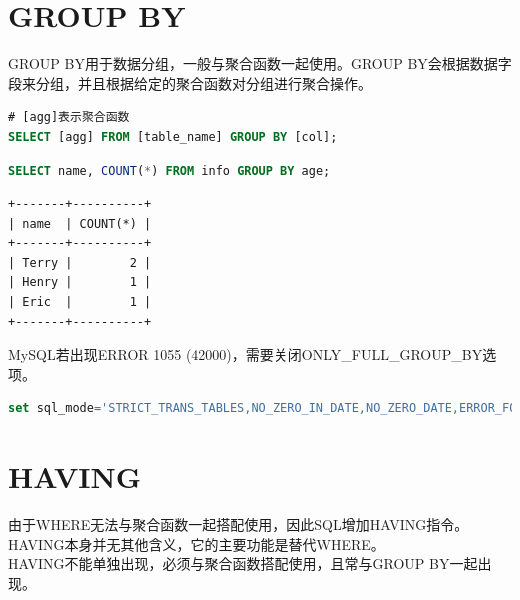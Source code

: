 \documentclass[12pt, openany, oneside]{book}
\begin{document}
\section{GROUP BY}

GROUP BY用于数据分组，一般与聚合函数一起使用。GROUP BY会根据数据字段来分组，并且根据给定的聚合函数对分组进行聚合操作。

\vspace{-0.5cm}

\begin{lstlisting}[language=SQL]
# [agg]表示聚合函数
SELECT [agg] FROM [table_name] GROUP BY [col];
\end{lstlisting}

\vspace{0.5cm}


\begin{lstlisting}[language=SQL]
SELECT name, COUNT(*) FROM info GROUP BY age;
\end{lstlisting}

\begin{tcolorbox}
    \begin{verbatim}
+-------+----------+
| name  | COUNT(*) |
+-------+----------+
| Terry |        2 |
| Henry |        1 |
| Eric  |        1 |
+-------+----------+
	\end{verbatim}
\end{tcolorbox}

MySQL若出现ERROR 1055 (42000)，需要关闭ONLY\_FULL\_GROUP\_BY选项。

\vspace{-0.5cm}

\begin{lstlisting}[language=SQL, breaklines=true, breakatwhitespace=false]
set sql_mode='STRICT_TRANS_TABLES,NO_ZERO_IN_DATE,NO_ZERO_DATE,ERROR_FOR_DIVISION_BY_ZERO,NO_ENGINE_SUBSTITUTION';
\end{lstlisting}

\section{HAVING}

由于WHERE无法与聚合函数一起搭配使用，因此SQL增加HAVING指令。HAVING本身并无其他含义，它的主要功能是替代WHERE。 \\

HAVING不能单独出现，必须与聚合函数搭配使用，且常与GROUP BY一起出现。
\end{document}
